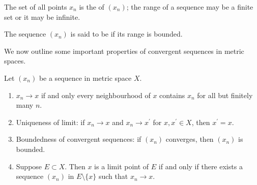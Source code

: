 \begin{definition}
The set of all points $x_n$ is the  of $(x_n)$; the range of a sequence may be a finite set or it may be infinite.

The sequence $(x_n)$ is said to be  if its range is bounded.
\end{definition}

We now outline some important properties of convergent sequences in metric spaces.

\begin{proposition}
Let $(x_n)$ be a sequence in metric space $X$.
\begin{enumerate}[label=(\arabic*)]
\item $x_n\to x$ if and only every neighbourhood of $x$ contains $x_n$ for all but finitely many $n$.
\item Uniqueness of limit: if $x_n\to x$ and $x_n\to x^\prime$ for $x,x^\prime\in X$, then $x^\prime=x$.
\item Boundedness of convergent sequences: if $(x_n)$ converges, then $(x_n)$ is bounded.
\item Suppose $E\subset X$. Then $x$ is a limit point of $E$ if and only if there exists a sequence $(x_n)$ in $E\setminus\{x\}$ such that $x_n\to x$.
\end{enumerate}
\end{proposition}

